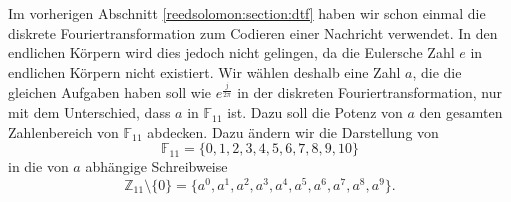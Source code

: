 Im vorherigen Abschnitt \ref{reedsolomon:section:dtf} haben wir schon einmal die diskrete Fouriertransformation zum Codieren einer Nachricht verwendet. In den endlichen Körpern wird dies jedoch nicht gelingen, da die Eulersche Zahl $e$ in endlichen Körpern nicht existiert.
Wir wählen deshalb eine Zahl $a$, die die gleichen Aufgaben haben soll wie $e^{\frac{j}{2 \pi}}$ in der diskreten Fouriertransformation, nur mit dem Unterschied, dass $a$ in $\mathbb{F}_{11}$ ist. Dazu soll die Potenz von $a$ den gesamten Zahlenbereich von $\mathbb{F}_{11}$ abdecken.
Dazu ändern wir die Darstellung von
\[
\mathbb{F}_{11} = \{0,1,2,3,4,5,6,7,8,9,10\}
\]
in die von $a$ abhängige Schreibweise 
\[
\mathbb{Z}_{11}\setminus\{0\} = \{a^0, a^1, a^2, a^3, a^4, a^5, a^6, a^7, a^8, a^9\}.
\]
%

